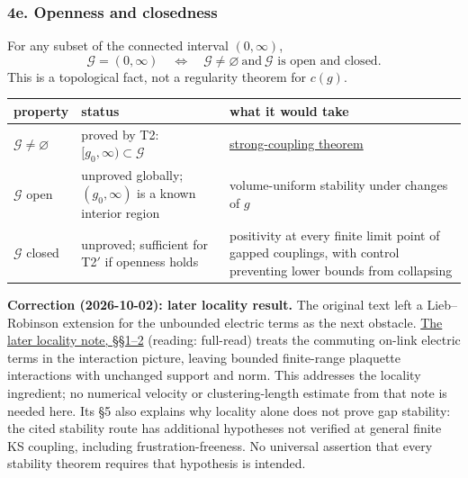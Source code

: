 \documentclass[11pt,a4paper]{article}
\begin{document}
\subsubsection{4e. Openness and
closedness}\label{e.-openness-and-closedness}

For any subset of the connected interval \((0,\infty)\),
\[\mathcal G=(0,\infty)\quad\Longleftrightarrow\quad
\mathcal G\ne\varnothing\ \text{and}\ \mathcal G\text{ is open and closed}.\]
This is a topological fact, not a regularity theorem for \(c(g)\).

\begin{longtable}[]{@{}
  >{\raggedright\arraybackslash}p{}
  >{\raggedright\arraybackslash}p{}
  >{\raggedright\arraybackslash}p{}@{}}
\toprule\noalign{}
\begin{minipage}[b]{\linewidth}\raggedright
property
\end{minipage} & \begin{minipage}[b]{\linewidth}\raggedright
status
\end{minipage} & \begin{minipage}[b]{\linewidth}\raggedright
what it would take
\end{minipage} \\
\midrule\noalign{}
\endhead
\bottomrule\noalign{}
\endlastfoot
\(\mathcal G\ne\varnothing\) & proved by T2:
\([g_0,\infty)\subset\mathcal G\) &
\href{strong-coupling-uniform-gap.md}{strong-coupling theorem} \\
\(\mathcal G\) open & unproved globally; \((g_0,\infty)\) is a known
interior region & volume-uniform stability under changes of \(g\) \\
\(\mathcal G\) closed & unproved; sufficient for T2\('\) if openness
holds & positivity at every finite limit point of gapped couplings, with
control preventing lower bounds from collapsing \\
\end{longtable}

\textbf{Correction (2026-10-02): later locality result.} The original
text left a Lieb--Robinson extension for the unbounded electric terms as
the next obstacle. \href{lieb-robinson-kogut-susskind.md}{The later
locality note, §§1--2} (reading: full-read) treats the commuting on-link
electric terms in the interaction picture, leaving bounded finite-range
plaquette interactions with unchanged support and norm. This addresses
the locality ingredient; no numerical velocity or clustering-length
estimate from that note is needed here. Its §5 also explains why
locality alone does not prove gap stability: the cited stability route
has additional hypotheses not verified at general finite KS coupling,
including frustration-freeness. No universal assertion that every
stability theorem requires that hypothesis is intended.
\end{document}
